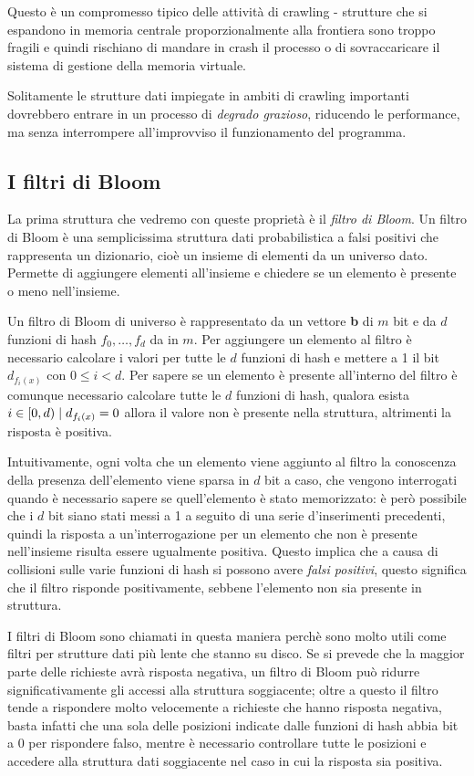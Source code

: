 Questo è un compromesso tipico delle attività di crawling - strutture che si espandono in memoria centrale proporzionalmente alla frontiera sono troppo fragili e quindi rischiano di mandare in crash il processo o di sovraccaricare il sistema di gestione della memoria virtuale.

Solitamente le strutture dati impiegate in ambiti di crawling importanti dovrebbero entrare in un processo di \textit{degrado grazioso}, riducendo le performance, ma senza interrompere all'improvviso il funzionamento del programma.
\subsection{I filtri di Bloom}
La prima struttura che vedremo con queste proprietà è il \textit{filtro di Bloom}. Un filtro di Bloom \cite{Bloom} è una semplicissima struttura dati probabilistica a falsi positivi che rappresenta un dizionario, cioè un insieme di elementi da un universo dato. Permette di aggiungere elementi all'insieme e chiedere se un elemento è presente o meno nell'insieme.

Un filtro di Bloom di universo  è rappresentato da un vettore \textbf{b} di $m$ bit e da $d$ funzioni di hash $f_0, \dots, f_d$ da  in $m$. Per aggiungere un elemento al filtro è necessario calcolare i valori per tutte le $d$ funzioni di hash e mettere a 1 il bit $d_{f_i(x)}$ con $0 \leq i < d$. Per sapere se un elemento è presente all'interno del filtro è comunque necessario calcolare tutte le $d$ funzioni di hash, qualora esista $i \in [0, d) \hspace{1mm}|\hspace{1mm} d_{f_i(x)} = 0$ allora il valore non è presente nella struttura, altrimenti la risposta è positiva.

Intuitivamente, ogni volta che un elemento viene aggiunto al filtro la conoscenza della presenza dell'elemento viene sparsa in $d$ bit a caso, che vengono interrogati quando è necessario sapere se quell'elemento è stato memorizzato: è però possibile che i $d$ bit siano stati messi a 1 a seguito di una serie d'inserimenti precedenti, quindi la risposta a un'interrogazione per un elemento che non è presente nell'insieme risulta essere ugualmente positiva. Questo implica che a causa di collisioni sulle varie funzioni di hash si possono avere \textit{falsi positivi}, questo significa che il filtro risponde positivamente, sebbene l'elemento non sia presente in struttura.

I filtri di Bloom sono chiamati in questa maniera perchè sono molto utili come filtri per strutture dati più lente che stanno su disco. Se si prevede che la maggior parte delle richieste avrà risposta negativa, un filtro di Bloom può ridurre significativamente gli accessi alla struttura soggiacente; oltre a questo il filtro tende a rispondere molto velocemente a richieste che hanno risposta negativa, basta infatti che una sola delle posizioni indicate dalle funzioni di hash abbia bit a 0 per rispondere falso, mentre è necessario controllare tutte le posizioni e accedere alla struttura dati soggiacente nel caso in cui la risposta sia positiva.

